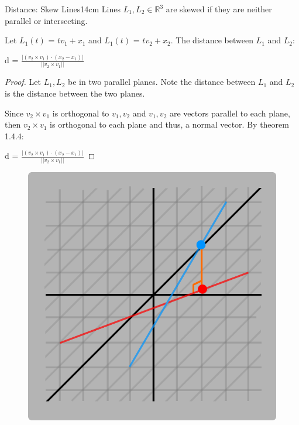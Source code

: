     \newpage



    \begin{wtheorem}{Distance: Skew Lines}{14cm}
        Lines $L_1,L_2 \in \mathbb{R}^3$ are skewed if they are neither parallel
        or intersecting.

        Let $L_1(t)$ = $tv_1 + x_1$ and $L_1(t)$ = $tv_2 + x_2$.
        The distance between $L_1$ and $L_2$:

        \hspace{0.5cm}
        d = $\frac{| (v_2 \times v_1) \cdot (x_2-x_1) |}{||v_2 \times v_1||}$
    \end{wtheorem}

    \begin{proof}
        Let $L_1,L_2$ be in two parallel planes.
        Note the distance between $L_1$ and $L_2$ is the distance between
        the two planes.

        Since $v_2 \times v_1$ is orthogonal to $v_1,v_2$ and $v_1,v_2$ are
        vectors parallel to each plane, then $v_2 \times v_1$ is orthogonal to
        each plane and thus, a normal vector.
        By {\color{red} theorem 1.4.4}:

        \hspace{0.5cm}
        d = $\frac{| (v_2 \times v_1) \cdot (x_2-x_1) |}{||v_2 \times v_1||}$
    \end{proof}

    \begin{figure}[h]
        \centering
        \includegraphics[scale=0.3]{Images/1.4.5.png}
    \end{figure}





